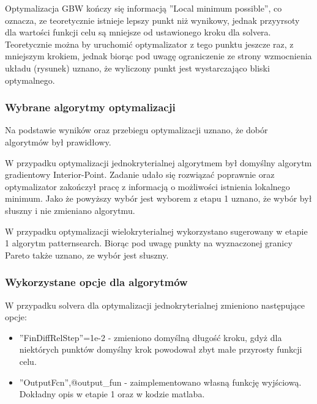 \documentclass{article}
\begin{document}
Optymalizacja GBW kończy się informacją ''Local minimum possible'', co oznacza, ze teoretycznie istnieje lepszy punkt niż wynikowy, jednak przyyrsoty dla wartości funkcji celu są mniejsze od
ustawionego kroku dla solvera. Teoretycznie można by uruchomić optymalizator z tego punktu jeszcze raz, z mniejszym krokiem, jednak biorąc pod uwagę ograniczenie ze strony wzmocnienia układu (rysunek) uznano,
że wyliczony punkt jest wystarczająco bliski optymalnego.

\subsubsection{Wybrane algorytmy optymalizacji}
Na podstawie wyników oraz przebiegu optymalizacji uznano, że dobór algorytmów był prawidłowy.

W przypadku optymalizacji jednokryterialnej algorytmem był domyślny algorytm gradientowy Interior-Point.
Zadanie udało się rozwiązać poprawnie oraz optymalizator zakończył pracę z informacją o możliwości istnienia lokalnego minimum. Jako że
powyższy wybór jest wyborem z etapu 1 uznano, że wybór był słuszny i nie zmieniano algorytmu.

W przypadku optymalizacji wielokryterialnej wykorzystano sugerowany w etapie 1 algorytm patternsearch. Biorąc pod uwagę punkty na wyznaczonej granicy Pareto także uznano, ze wybór jest słuszny.
\subsubsection{Wykorzystane opcje dla algorytmów}
W przypadku solvera dla optymalizacji jednokryterialnej zmieniono następujące opcje:
\begin{itemize}
    \item ''FinDiffRelStep''=1e-2 - zmieniono domyślną długość kroku, gdyż dla niektórych punktów domyślny krok powodował zbyt małe przyrosty funkcji celu.
    \item ''OutputFcn'',@output\_fun - zaimplementowano własną funkcję wyjściową. Dokładny opis w etapie 1 oraz w kodzie matlaba.
\end{itemize}
\end{document}
